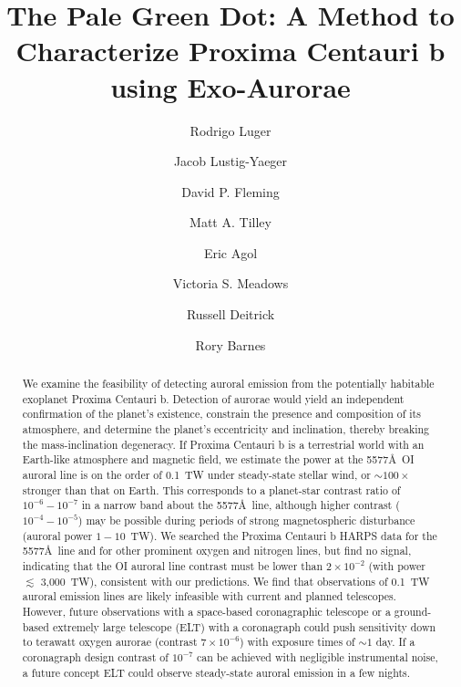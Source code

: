 \documentclass{emulateapj}
\begin{document}
\title{The Pale Green Dot: A Method to Characterize Proxima Centauri \MakeLowercase{b} using Exo-Aurorae}

\author{Rodrigo Luger}
\author{Jacob Lustig-Yaeger}
\author{David P. Fleming}
\author{Matt A. Tilley}
\author{Eric Agol}
\author{Victoria S. Meadows}
\author{Russell Deitrick}
\author{Rory Barnes}


\begin{abstract}
We examine the feasibility of detecting auroral emission from the potentially habitable exoplanet Proxima Centauri b. Detection of aurorae would yield an independent confirmation of the planet's existence, constrain the presence and composition of its atmosphere, and determine the planet's eccentricity and inclination, thereby breaking the mass-inclination degeneracy. If Proxima Centauri b is a terrestrial world with an Earth-like atmosphere and magnetic field, we estimate the power at the 5577\AA\ OI auroral line is on the order of 0.1~TW under steady-state stellar wind, or ${\sim} 100 {\times}$ stronger than that on Earth. This corresponds to a planet-star contrast ratio of $10^{-6}-10^{-7}$ in a narrow band about the 5577\AA\ line, although higher contrast ($10^{-4}-10^{-5}$) may be possible during periods of strong magnetospheric disturbance (auroral power $1-10$~TW). We searched the Proxima Centauri b HARPS data for the 5577\AA\ line and for other prominent oxygen and nitrogen lines, but find no signal, indicating that the OI auroral line contrast must be lower than $2\times 10^{-2}$ (with power $\lesssim$ 3,000~TW), consistent with our predictions. We find that observations of 0.1~TW auroral emission lines are likely infeasible with current and planned telescopes.  However, future observations with a space-based coronagraphic telescope or a ground-based extremely large telescope (ELT) with a coronagraph could push sensitivity down to terawatt oxygen aurorae (contrast $7\times 10^{-6}$) with exposure times of ${\sim} 1$ day. If a coronagraph design contrast of $10^{-7}$ can be achieved with negligible instrumental noise, a future concept ELT could observe steady-state auroral emission in a few nights.\\[0in]
\end{abstract}
\end{document}
